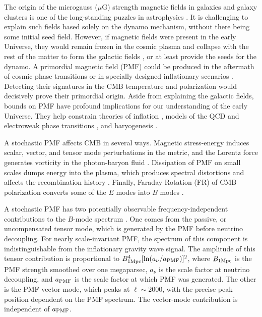 The origin of the microgauss ($\mu$G) strength magnetic fields in galaxies and galaxy clusters is one of the long-standing puzzles in astrophysics \cite{Durrer:2013pga}. It is challenging to explain such fields based solely on the dynamo mechanism, without there being some initial seed field. However, if magnetic fields were present in the early Universe, they would remain frozen in the cosmic plasma and collapse with the rest of the matter to form the galactic fields \cite{Grasso:2000wj}, or at least provide the seeds for the dynamo. A primordial magnetic field (PMF) could be produced in the aftermath of cosmic phase transitions \cite{Vachaspati:1991nm} or in specially designed inflationary scenarios \cite{Turner:1987bw,Ratra:1991bn}. Detecting their signatures in the CMB temperature and polarization would decisively prove their primordial origin. Aside from explaining the galactic fields, bounds on PMF have profound implications for our understanding of the early Universe.  They help constrain theories of inflation \cite{Bonvin:2011dt}, models of the QCD and electroweak phase transitions \cite{Caprini:2007xq}, and baryogenesis \cite{Vachaspati:2001nb}.

A stochastic PMF affects CMB in several ways. Magnetic stress-energy induces scalar, vector, and tensor mode perturbations in the metric, and the Lorentz force generates vorticity in the photon-baryon fluid \cite{Subramanian:1998fn,Mack:2001gc,Lewis:2004ef,Shaw:2009nf,Paoletti:2010rx}. Dissipation of PMF on small scales dumps energy into the plasma, which produces spectral distortions and affects the recombination history \cite{Kunze:2014eka}.  Finally, Faraday Rotation (FR) of CMB polarization converts some of the $E$ modes into $B$ modes \cite{Kosowsky:2004zh,Pogosian:2011qv}.

A stochastic PMF has two potentially observable frequency-independent contributions to the $B$-mode spectrum \cite{Shaw:2009nf}. One comes from the passive, or uncompensated tensor mode, which is generated by the PMF before neutrino decoupling. For nearly scale-invariant PMF, the spectrum of this component is indistinguishable from the inflationary gravity wave signal. The amplitude of this tensor contribution is proportional to $B^4_{1\rm{Mpc}} [\ln(a_\nu / a_{\rm{PMF}})]^2$, where $B_{1\rm{Mpc}}$ is the PMF strength smoothed over one megaparsec, $a_\nu$ is the scale factor at neutrino decoupling, and $a_{\rm{PMF}}$ is the scale factor at which PMF was generated. The other is the PMF vector mode, which peaks at $\ell \sim 2000$, with the precise peak position dependent on the PMF spectrum. The vector-mode contribution is independent of $a_{\rm{PMF}}$. 

